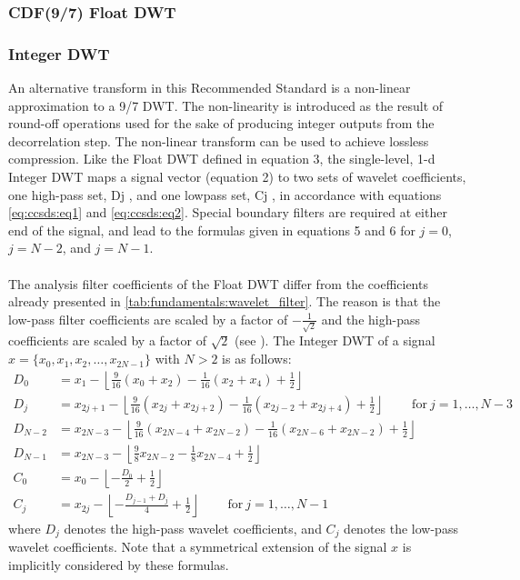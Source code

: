 \subsubsection{\gls{CDF}(9/7) Float DWT}\label{subsec:1d_float_dwt}

\subsubsection{Integer DWT}\label{subsec:1d_float_dwt}
An alternative transform in this Recommended Standard is a non-linear approximation to a 9/7 DWT. The non-linearity is introduced as the result of round-off operations used for the sake of producing integer outputs from the decorrelation step. The non-linear transform can be used to achieve lossless compression\cite{Calderbank}. Like the Float DWT defined in equation 3, the single-level, 1-d Integer DWT maps a signal vector (equation 2) to two sets of wavelet coefficients, one high-pass set, Dj , and one lowpass set, Cj , in accordance with equations \autoref{eq:ccsds:eq1} and \autoref{eq:ccsds:eq2}. Special boundary filters are required at either end of the signal, and lead to the formulas given in equations 5 and 6 for $j=0$, $j=N-2$, and $j=N-1$.
\\\\
The analysis filter coefficients of the Float DWT differ from the coefficients already presented in \autoref{tab:fundamentals:wavelet_filter}. The reason is that the low-pass filter coefficients are scaled by a factor of $-\frac{1}{\sqrt{2}}$ and the high-pass coefficients are scaled by a factor of $\sqrt{2}$ (see \cite[p.~3-3]{CCSDS122blue}). The Integer DWT of a signal  $x=\{x_0,x_1,x_2,\ldots,x_{2N-1}\}$ with $N>2$ is as follows:
\begin{align}
D_0     &= x_1-\left\lfloor\frac{9}{16}(x_0+x_2)-\frac{1}{16}(x_2+x_4)+\frac{1}{2}\right\rfloor\nonumber\\
D_j     &= x_{2j+1}-\left\lfloor\frac{9}{16}(x_{2j}+x_{2j+2})-\frac{1}{16}(x_{2j-2}+x_{2j+4})+\frac{1}{2}\right\rfloor\qquad\ \mathrm{for}\ j=1,\ldots,N-3\label{eq:ccsds:eq1}\\
D_{N-2} &= x_{2N-3}-\left\lfloor\frac{9}{16}(x_{2N-4}+x_{2N-2})-\frac{1}{16}(x_{2N-6}+x_{2N-2})+\frac{1}{2}\right\rfloor\nonumber\\
D_{N-1} &= x_{2N-3}-\left\lfloor\frac{9}{8}x_{2N-2}-\frac{1}{8}x_{2N-4}+\frac{1}{2}\right\rfloor\nonumber\\
C_0     &= x_0-\left\lfloor-\frac{D_0}{2}+\frac{1}{2}\right\rfloor\nonumber\\
C_j     &= x_{2j}-\left\lfloor-\frac{D_{j-1}+D_j}{4}+\frac{1}{2}\right\rfloor\qquad\ \mathrm{for}\ j=1,\ldots,N-1\label{eq:ccsds:eq2}
\end{align}
where $D_j$ denotes the high-pass wavelet coefficients, and $C_j$ denotes the low-pass wavelet coefficients. Note that a symmetrical extension of the signal $x$ is implicitly considered by these formulas.
